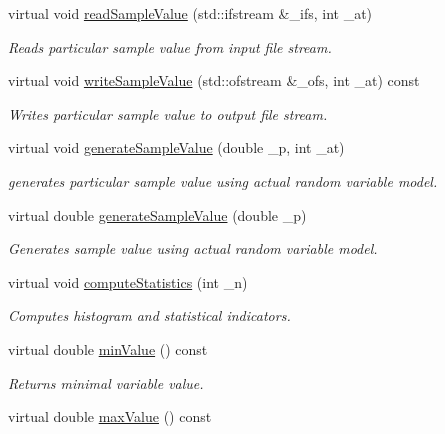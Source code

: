 \begin{DoxyCompactItemize}
virtual void \hyperlink{class_go_s_u_m_1_1_t_model_variable_afee2c55fb595ff40904551e4a7edf360}{read\-Sample\-Value} (std\-::ifstream \&\-\_\-ifs, int \-\_\-at)
\begin{DoxyCompactList}\small\item\em Reads particular sample value from input file stream. \end{DoxyCompactList}\item 
virtual void \hyperlink{class_go_s_u_m_1_1_t_model_variable_a98d527cb3d0ce4c3a96ddb4e04c0d931}{write\-Sample\-Value} (std\-::ofstream \&\-\_\-ofs, int \-\_\-at) const 
\begin{DoxyCompactList}\small\item\em Writes particular sample value to output file stream. \end{DoxyCompactList}\item 
virtual void \hyperlink{class_go_s_u_m_1_1_t_model_variable_a94c22ba7a540482c9f38ca5f00d9a755}{generate\-Sample\-Value} (double \-\_\-p, int \-\_\-at)
\begin{DoxyCompactList}\small\item\em generates particular sample value using actual random variable model. \end{DoxyCompactList}\item 
virtual double \hyperlink{class_go_s_u_m_1_1_t_model_variable_a5ebe0e2a02aa1a98fa2442865170a2f5}{generate\-Sample\-Value} (double \-\_\-p)
\begin{DoxyCompactList}\small\item\em Generates sample value using actual random variable model. \end{DoxyCompactList}\item 
virtual void \hyperlink{class_go_s_u_m_1_1_t_model_variable_ad1995ed1abea87ed8678f65659cf7a64}{compute\-Statistics} (int \-\_\-n)
\begin{DoxyCompactList}\small\item\em Computes histogram and statistical indicators. \end{DoxyCompactList}\item 
virtual double \hyperlink{class_go_s_u_m_1_1_t_model_variable_a0395e6699e577b7ccb77e19787adc169}{min\-Value} () const 
\begin{DoxyCompactList}\small\item\em Returns minimal variable value. \end{DoxyCompactList}\item 
virtual double \hyperlink{class_go_s_u_m_1_1_t_model_variable_a0d9ad1fc30fde0f3dd7ba204f1b525a2}{max\-Value} () const 

\end{DoxyCompactItemize}

